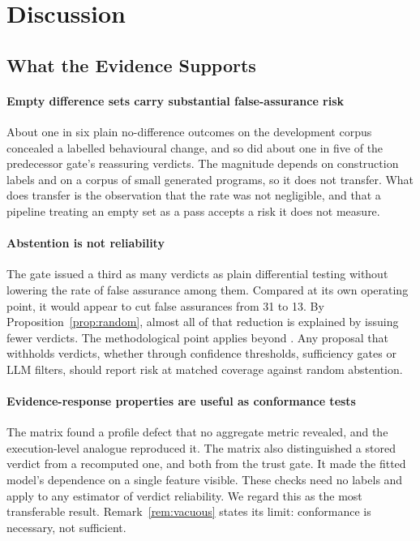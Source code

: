 \section{Discussion}\label{sec:discussion}

\subsection{What the Evidence Supports}
\paragraph*{Empty difference sets carry substantial false-assurance risk} About one in six plain no-difference outcomes on the development corpus concealed a labelled behavioural change, and so did about one in five of the predecessor gate's reassuring verdicts. The magnitude depends on construction labels and on a corpus of small generated programs, so it does not transfer. What does transfer is the observation that the rate was not negligible, and that a pipeline treating an empty set as a pass accepts a risk it does not measure.

\paragraph*{Abstention is not reliability} The gate issued a third as many verdicts as plain differential testing without lowering the rate of false assurance among them. Compared at its own operating point, it would appear to cut false assurances from 31 to 13. By Proposition~\ref{prop:random}, almost all of that reduction is explained by issuing fewer verdicts. The methodological point applies beyond \sbg{}. Any proposal that withholds verdicts, whether through confidence thresholds, sufficiency gates or LLM filters, should report risk at matched coverage against random abstention.

\paragraph*{Evidence-response properties are useful as conformance tests} The \ers{} matrix found a profile defect that no aggregate metric revealed, and the execution-level analogue reproduced it. The matrix also distinguished a stored verdict from a recomputed one, and both from the trust gate. It made the fitted model's dependence on a single feature visible. These checks need no labels and apply to any estimator of verdict reliability. We regard this as the most transferable result. Remark~\ref{rem:vacuous} states its limit: conformance is necessary, not sufficient.

